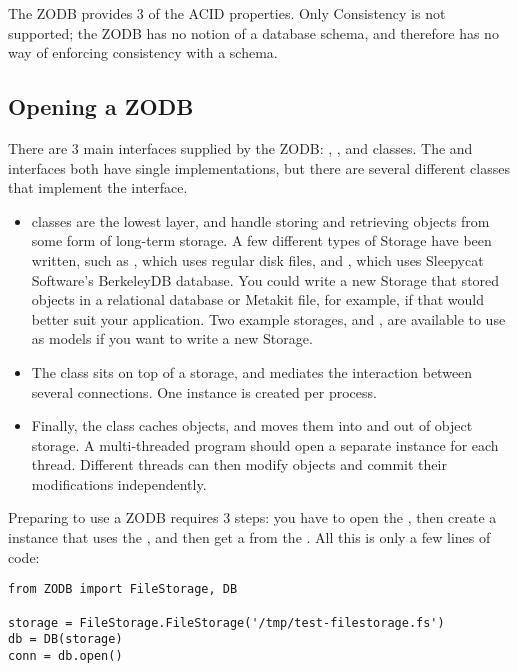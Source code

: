 The ZODB provides 3 of the ACID properties.  Only Consistency is not
supported; the ZODB has no notion of a database schema, and therefore
has no way of enforcing consistency with a schema.

\subsection{Opening a ZODB}

There are 3 main interfaces supplied by the ZODB:
, , and  classes. The
 and  interfaces both have single
implementations, but there are several different classes that
implement the  interface.

\begin{itemize}
 \item {} classes are the lowest layer, and handle
 storing and retrieving objects from some form of long-term storage.
 A few different types of Storage have been written, such as
 , which uses regular disk files, and
 , which uses Sleepycat Software's BerkeleyDB
 database.  You could write a new Storage that stored objects in a
 relational database or Metakit file, for example, if that would
 better suit your application.  Two example storages,
  and , are available to use
 as models if you want to write a new Storage.

 \item The  class sits on top of a storage, and mediates the
 interaction between several connections.  One  instance is
 created per process.

 \item Finally, the  class caches objects, and moves
 them into and out of object storage.  A multi-threaded program should
 open a separate  instance for each thread.
 Different threads can then modify objects and commit their
 modifications independently.

\end{itemize}

Preparing to use a ZODB requires 3 steps: you have to open the
, then create a  instance that uses the , and then get
a  from the .  All this is only a few lines of
code:

\begin{verbatim}
from ZODB import FileStorage, DB

storage = FileStorage.FileStorage('/tmp/test-filestorage.fs')
db = DB(storage)
conn = db.open()
\end{verbatim}

